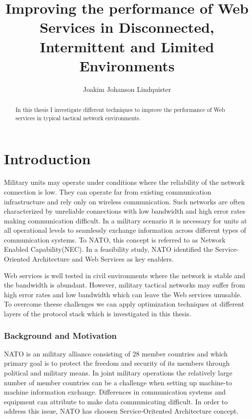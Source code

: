 \documentclass[USenglish]{article}
\title{Improving the performance of Web Services in Disconnected, Intermittent and Limited Environments}
\author{Joakim Johanson Lindquister}
\begin{document}
\ififorside{}

\begin{abstract}
In this thesis I investigate different techniques to improve the performance of Web services in typical tactical network environments.
\end{abstract}
\pagebreak

\tableofcontents 
\listoftables
\listoffigures

\pagebreak


\part{Introduction}
Military units may operate under conditions where the reliability of the network connection is low. They can operate far from existing communication infrastructure and rely only on wireless communication. Such networks are often characterized by unreliable connections with low bandwidth and high error rates making communication difficult. In a military scenario it is necessary for units at all operational levels to seamlessly exchange information across different types of communication systems. To NATO, this concept is referred to as Network Enabled Capability(NEC). In a feasibility study, NATO identified the Service-Oriented Architecture and Web Services as key enablers\cite{nnec-study}.

Web services is well tested in civil environments where the network is stable and the bandwidth is abundant. However, military tactical networks may suffer from high error rates and low bandwidth which can leave the Web services unusable. To overcome theese challenges we can apply optimization techniques at different layers of the protocol stack which is investigated in this thesis.


\section{Background and Motivation}
NATO is an military alliance consisting of 28 member countries\cite{nato-homepage-member-countries} and which primary goal is to protect the freedom and security of its members through political and military means. In joint military operations the relatively large number of member countries can be a challenge when setting up machine-to machine information exchange. Differences in communication systems and equipment can attribute to make data communicating difficult. In order to address this issue, NATO has choosen Service-Oritented Architecture concept.
\end{document}

